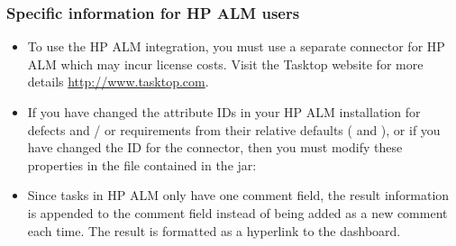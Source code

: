 
\subsubsection{Specific information for HP ALM users}
\begin{itemize}
\item To use the HP ALM integration, you must use a separate connector for HP ALM which may incur license costs. Visit the Tasktop website for more details \url{http://www.tasktop.com}.
\item If you have changed the attribute IDs in your HP ALM installation for defects and / or requirements from their relative defaults ( and ), or if you have changed the ID for the connector, then you must modify these properties in the  file contained in the jar:\\
\item Since tasks in HP ALM only have one comment field, the result information is appended to the comment field instead of being added as a new comment each time. The result is formatted as a hyperlink to the dashboard.
\end{itemize}


